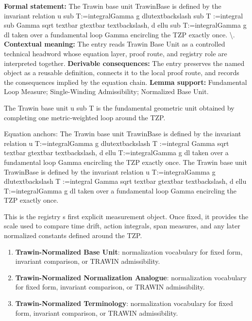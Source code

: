 \begingroup\footnotesize\setlength{\emergencystretch}{3em}\sloppy
\textbf{Formal statement:} The Trawin base unit TrawinBase is defined by the invariant relation u sub T:=integralGamma g  dlutextbackslash sub T :=integral sub Gamma sqrt textbar gtextbar textbackslash, d ellu sub T:=integralGamma g dl taken over a fundamental loop Gamma encircling the TZP exactly once. \textbackslash{}. \textbf{Contextual meaning:} The entry reads Trawin Base Unit as a controlled technical headword whose equation layer, proof route, and registry role are interpreted together. \textbf{Derivable consequences:} The entry preserves the named object as a reusable definition, connects it to the local proof route, and records the consequences implied by the equation chain. \textbf{Lemma support:} Fundamental Loop Measure; Single-Winding Admissibility; Normalized Base Unit.\par
\endgroup

The Trawin base unit u sub T is the fundamental geometric unit obtained by completing one metric-weighted loop around the TZP.

Equation anchors: The Trawin base unit TrawinBase is defined by the invariant relation u T:=integralGamma g  dlutextbackslash T :=integral Gamma sqrt textbar gtextbar textbackslash, d ellu T:=integralGamma g dl taken over a fundamental loop Gamma encircling the TZP exactly once. The Trawin base unit TrawinBase is defined by the invariant relation u T:=integralGamma g  dlutextbackslash T :=integral Gamma sqrt textbar gtextbar textbackslash, d ellu T:=integralGamma g dl taken over a fundamental loop Gamma encircling the TZP exactly once.

This is the registry s first explicit measurement object. Once fixed, it provides the scale used to compare time drift, action integrals, span measures, and any later normalized constants defined around the TZP.
\endgroup

\begingroup\footnotesize\sloppy
\begin{enumerate}[leftmargin=1.35em,itemsep=1pt,topsep=1pt,parsep=0pt]
\item \textbf{Trawin-Normalized Base Unit}: normalization vocabulary for fixed form, invariant comparison, or TRAWIN admissibility.
\item \textbf{Trawin-Normalized Normalization Analogue}: normalization vocabulary for fixed form, invariant comparison, or TRAWIN admissibility.
\item \textbf{Trawin-Normalized Terminology}: normalization vocabulary for fixed form, invariant comparison, or TRAWIN admissibility.
\end{enumerate}
\endgroup

